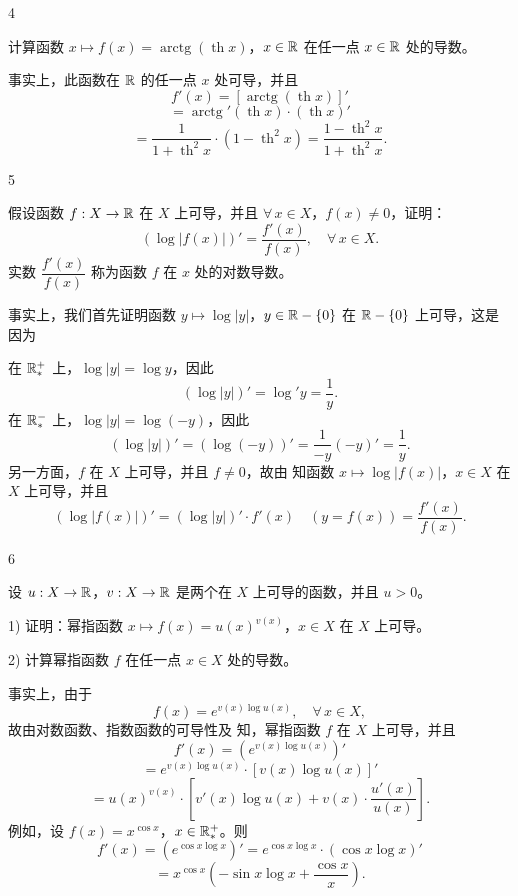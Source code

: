 \begin{sourceexample}{4}

	计算函数 \(x\longmapsto f(x)=\operatorname{arctg}(\operatorname{th}x)\)，\(x\in\mathbb{R}\) 在任一点 \(x\in\mathbb{R}\) 处的导数。

	事实上，此函数在 \(\mathbb{R}\) 的任一点 \(x\) 处可导，并且
	\[
	f'(x)=[\operatorname{arctg}(\operatorname{th}x)]'
	\]
	\[
	=\operatorname{arctg}'(\operatorname{th}x)\cdot(\operatorname{th}x)'
	\]
	\[
	=\frac1{1+\operatorname{th}^2x}\cdot(1-\operatorname{th}^2x)=\frac{1-\operatorname{th}^2x}{1+\operatorname{th}^2x}.
	\]

\end{sourceexample}

\begin{sourceexample}{5}

	假设函数 \(f:X\to\mathbb{R}\) 在 \(X\) 上可导，并且 \(\forall\,x\in X\)，\(f(x)\neq0\)，证明：
	\[
	(\log|f(x)|)'=\frac{f'(x)}{f(x)},\quad\forall\,x\in X.
	\]
	实数 \(\dfrac{f'(x)}{f(x)}\) 称为函数 \(f\) 在 \(x\) 处的对数导数。

	事实上，我们首先证明函数 \(y\longmapsto\log|y|\)，\(y\in\mathbb{R}-\{0\}\) 在 \(\mathbb{R}-\{0\}\) 上可导，这是因为

	在 \(\mathbb{R}_*^+\) 上，\(\log|y|=\log y\)，因此
	\[
	(\log|y|)'=\log'y=\frac1y.
	\]
	在 \(\mathbb{R}_*^-\) 上，\(\log|y|=\log(-y)\)，因此
	\[
	(\log|y|)'=(\log(-y))'=\frac1{-y}(-y)'=\frac1y.
	\]
	另一方面，\(f\) 在 \(X\) 上可导，并且 \(f\neq0\)，故由 知函数 \(x\longmapsto\log|f(x)|\)，\(x\in X\) 在 \(X\) 上可导，并且
	\[
	(\log|f(x)|)'=(\log|y|)'\cdot f'(x)\quad(y=f(x))=\frac{f'(x)}{f(x)}.
	\]

\end{sourceexample}

\begin{sourceexample}{6}

	设 \(u:X\to\mathbb{R}\)，\(v:X\to\mathbb{R}\) 是两个在 \(X\) 上可导的函数，并且 \(u>0\)。

	1) 证明：幂指函数 \(x\longmapsto f(x)=u(x)^{v(x)}\)，\(x\in X\) 在 \(X\) 上可导。

	2) 计算幂指函数 \(f\) 在任一点 \(x\in X\) 处的导数。

	事实上，由于
	\[
	f(x)=e^{v(x)\log u(x)},\quad\forall\,x\in X,
	\]
	故由对数函数、指数函数的可导性及 知，幂指函数 \(f\) 在 \(X\) 上可导，并且
	\[
	f'(x)=(e^{v(x)\log u(x)})'
	\]
	\[
	=e^{v(x)\log u(x)}\cdot[v(x)\log u(x)]'
	\]
	\[
	=u(x)^{v(x)}\cdot\left[v'(x)\log u(x)+v(x)\cdot\frac{u'(x)}{u(x)}\right].
	\]
	例如，设 \(f(x)=x^{\cos x}\)，\(x\in\mathbb{R}_*^+\)。则
	\[
	f'(x)=(e^{\cos x\log x})'=e^{\cos x\log x}\cdot(\cos x\log x)'
	\]
	\[
	=x^{\cos x}\left(-\sin x\log x+\frac{\cos x}{x}\right).
	\]

\end{sourceexample}

